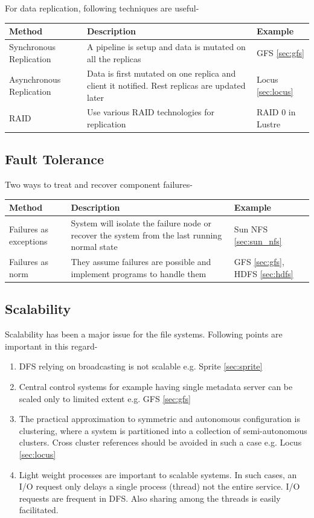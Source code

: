 \documentclass[a4paper,12pt]{article}
\begin{document}
For data replication, following techniques are useful-
\begin{table}[h]
\begin{tabular}{|p{2.4cm}|p{8.3cm}|p{2cm}|}
\hline
\textbf{Method} & \textbf{Description} & \textbf{Example} \\
\hline 
Synchronous Replication & A pipeline is setup and data is mutated on all the replicas & GFS \ref{sec:gfs} \\ 
\hline 
Asynchronous Replication  & Data is first mutated on one replica and client it notified. Rest replicas are updated later & Locus \ref{sec:locus} \\
\hline
RAID & Use various RAID technologies for replication & RAID 0 in Lustre \\
\hline 
\end{tabular} 
\end{table}

\subsection{Fault Tolerance}
Two ways to treat and recover component failures-
\begin{table}[h]
\begin{tabular}{|p{2.4cm}|p{8.3cm}|p{2cm}|}
\hline
\textbf{Method} & \textbf{Description} & \textbf{Example} \\ 
\hline
Failures as exceptions & System will isolate the failure node or recover the system from the last running normal state & Sun NFS \ref{sec:sun_nfs} \\ 
\hline 
Failures as norm & They assume failures are possible and implement programs to handle them & GFS \ref{sec:gfs}, HDFS \ref{sec:hdfs} \\ 
\hline 
\end{tabular} 
\end{table}

\subsection{Scalability}
Scalability has been a major issue for the file systems. Following points are important in this regard-
\begin{enumerate}
\item DFS relying on broadcasting is not scalable e.g. Sprite \ref{sec:sprite}
\item Central control systems for example having single metadata server can be scaled only to limited extent e.g. GFS \ref{sec:gfs}
\item The practical approximation to symmetric and autonomous configuration is clustering, where a system is partitioned into a collection of semi-autonomous clusters. Cross cluster references should be avoided in such a case e.g. Locus \ref{sec:locus}
\item Light weight processes are important to scalable systems. In such cases, an I/O request only delays a single process (thread) not the entire service. I/O requests are frequent in DFS. Also sharing among the threads is easily facilitated.
\end{enumerate}
\end{document}
